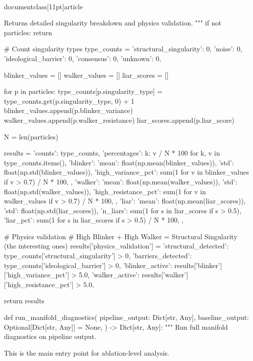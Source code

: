 \\documentclass[11pt]{article}
\begin{document}
\begin{CodeBlock}
    Returns detailed singularity breakdown and physics validation.
    """
    if not particles:
        return {}

    # Count singularity types
    type_counts = {
        'structural_singularity': 0,
        'noise': 0,
        'ideological_barrier': 0,
        'consensus': 0,
        'unknown': 0,
    }

    blinker_values = []
    walker_values = []
    liar_scores = []

    for p in particles:
        type_counts[p.singularity_type] = type_counts.get(p.singularity_type, 0) + 1
        blinker_values.append(p.blinker_variance)
        walker_values.append(p.walker_resistance)
        liar_scores.append(p.liar_score)

    N = len(particles)

    results = {
        'counts': type_counts,
        'percentages': {k: v / N * 100 for k, v in type_counts.items()},
        'blinker': {
            'mean': float(np.mean(blinker_values)),
            'std': float(np.std(blinker_values)),
            'high_variance_pct': sum(1 for v in blinker_values if v > 0.7) / N * 100,
        },
        'walker': {
            'mean': float(np.mean(walker_values)),
            'std': float(np.std(walker_values)),
            'high_resistance_pct': sum(1 for v in walker_values if v > 0.7) / N * 100,
        },
        'liar': {
            'mean': float(np.mean(liar_scores)),
            'std': float(np.std(liar_scores)),
            'n_liars': sum(1 for s in liar_scores if s > 0.5),
            'liar_pct': sum(1 for s in liar_scores if s > 0.5) / N * 100,
        },
    }

    # Physics validation
    # High Blinker + High Walker = Structural Singularity (the interesting ones)
    results['physics_validation'] = {
        'structural_detected': type_counts['structural_singularity'] > 0,
        'barriers_detected': type_counts['ideological_barrier'] > 0,
        'blinker_active': results['blinker']['high_variance_pct'] > 5.0,
        'walker_active': results['walker']['high_resistance_pct'] > 5.0,
    }

    return results


def run_manifold_diagnostics(
    pipeline_output: Dict[str, Any],
    baseline_output: Optional[Dict[str, Any]] = None,
) -> Dict[str, Any]:
    """
    Run full manifold diagnostics on pipeline output.

    This is the main entry point for ablation-level analysis.


\end{CodeBlock}
\end{document}
